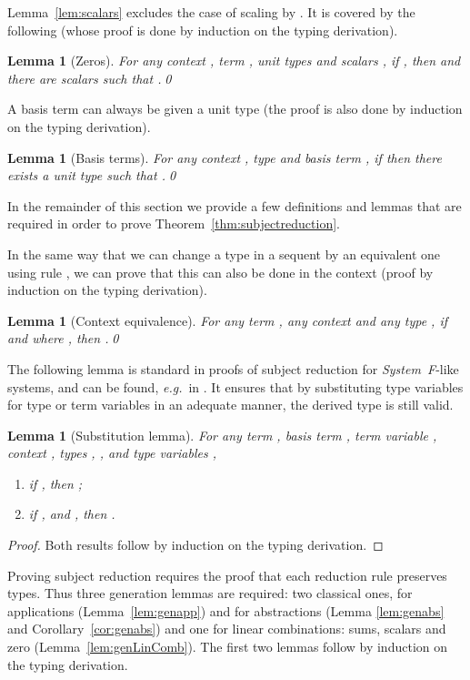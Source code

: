 \documentclass[colorlinks=true,linkcolor=black,urlcolor=black,citecolor=blue,submission,copyright,creativecommons]{eptcs}
\newtheorem{lemma}[theorem]{Lemma}
\newcommand{\eg}{\emph{e.g.}~}
\begin{document}
Lemma~\ref{lem:scalars} excludes the case of scaling by . It is
covered by the following (whose proof is done by induction on the
typing derivation).

\begin{lemma}[Zeros]\label{lem:zeros}
For any context , term , unit types  and scalars , if , then  and there are scalars  such that .\qed
\end{lemma}

A basis term can always be given a unit type (the proof is also done by induction on the typing derivation).
\begin{lemma}[Basis terms]\label{lem:basevectors}
  For any context , type  and basis term , if
   then there exists a unit type  such
  that .\qed
\end{lemma}

In the remainder of this section we provide a few definitions and lemmas that are required in order to prove Theorem~\ref{thm:subjectreduction}.

In the same way that we can change a type in a sequent by an
equivalent one using rule , we can prove that this can also be
done in the context (proof by induction on the typing derivation).

\begin{lemma}[Context equivalence]\label{lem:contextequiv} For any
  term , any context  and any type
  , if  and 
  where , then .\qed
\end{lemma}

The following lemma is standard in proofs of subject reduction for
{\em System~F}-like systems, and can be found, \eg in
\cite[Ch. 4]{Barendregt92}. It
ensures that by substituting type variables for type or term variables
in an adequate manner, the derived type is still valid.

\begin{lemma}[Substitution lemma]\label{lem:substitution} For any term
  , basis term , term variable , context ,
  types , ,  and type variables ,
  \begin{enumerate}
  \item\label{it:substitution1} if , then ;
  \item\label{it:substitution2} if ,  and , then .
  \end{enumerate}
\end{lemma}
\begin{proof}
Both results follow by induction on the typing derivation.
\end{proof}

\noindent Proving subject reduction requires the proof that each reduction rule
preserves types. Thus three generation lemmas are required: two
classical ones, for applications (Lemma~\ref{lem:genapp}) and for
abstractions (Lemma \ref{lem:genabs} and
Corollary~\ref{cor:genabs}) and one for linear combinations: sums,
scalars and zero (Lemma~\ref{lem:genLinComb}). The first two lemmas follow by induction on the typing derivation.
\end{document}
